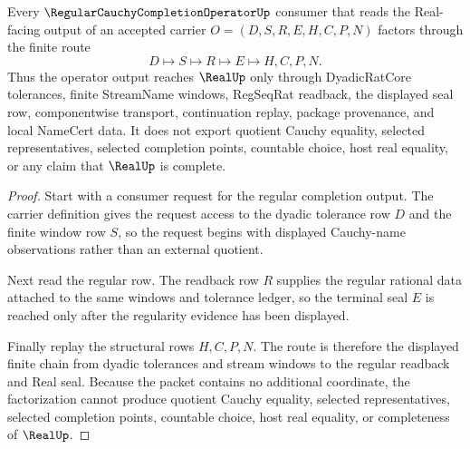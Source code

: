 \begin{theorem}
\label{thm:regular-cauchy-completion-operator-seal-route}
Every $\RegularCauchyCompletionOperatorUp$ consumer that reads the Real-facing output of an accepted carrier $O=(D,S,R,E,H,C,P,N)$ factors through the finite route
$$
D\longmapsto S\longmapsto R\longmapsto E\longmapsto H,C,P,N .
$$
Thus the operator output reaches $\RealUp$ only through DyadicRatCore tolerances, finite StreamName windows, RegSeqRat readback, the displayed seal row, componentwise transport, continuation replay, package provenance, and local NameCert data. It does not export quotient Cauchy equality, selected representatives, selected completion points, countable choice, host real equality, or any claim that $\RealUp$ is complete.
\end{theorem}
\begin{proof}
Start with a consumer request for the regular completion output. The carrier definition gives the request access to the dyadic tolerance row $D$ and the finite window row $S$, so the request begins with displayed Cauchy-name observations rather than an external quotient.

Next read the regular row. The readback row $R$ supplies the regular rational data attached to the same windows and tolerance ledger, so the terminal seal $E$ is reached only after the regularity evidence has been displayed.

Finally replay the structural rows $H,C,P,N$. The route is therefore the displayed finite chain from dyadic tolerances and stream windows to the regular readback and Real seal. Because the packet contains no additional coordinate, the factorization cannot produce quotient Cauchy equality, selected representatives, selected completion points, countable choice, host real equality, or completeness of $\RealUp$.
\end{proof}


\begin{closurestatus}{\RegularCauchyCompletionOperatorUp}
  \theoryclosure{\seedClosure}
  \formalstatus{\unformalizedV}
\end{closurestatus}
